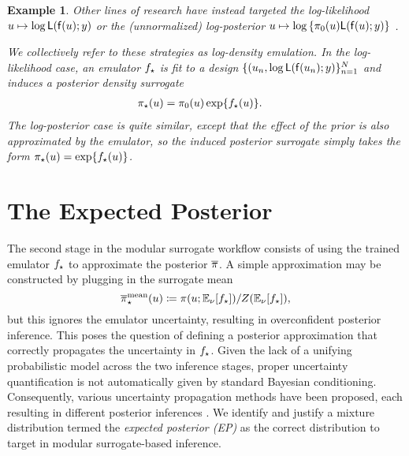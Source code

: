 \documentclass[12pt]{article}
\newtheorem{ex}{Example}
\begin{document}
\begin{ex} \label{ex:ldens-em}
Other lines of research have instead targeted the log-likelihood $u \mapsto \log \mathsf{L}(\mathsf{f}(u); y)$
\citep{VehtariParallelGP,FATES_CES,trainDynamics,quantileApprox,
ActiveLearningMCMC,FerEmulation,StuartTeck1,random_fwd_models,
GP_PDE_priors,OakleyllikEm,JosephMinEnergy,AlawiehIterativeGP}
or the (unnormalized) log-posterior 
$u \mapsto \log \left\{\pi_0(u)\mathsf{L}(\mathsf{f}(u); y)\right\}$
\citep{emPostDens,Kandasamy_2017,llikRBF,gp_surrogates_random_exploration,
landslideCalibration}.

We collectively refer to these strategies as \textit{log-density emulation}. In the 
log-likelihood case, an emulator ${f}_{\star}$ is fit to a design 
$\{(u_n, \log \mathsf{L}(\mathsf{f}(u_n); y)\}_{n=1}^{N}$
and induces a posterior density surrogate 
\begin{align}
{\pi}_{\star}(u) &= \pi_0(u) \exp\mathopen{}\left\{{f}_{\star}(u)\right\}\mathclose{}. \label{eq:post-em-llik}
\end{align}
The log-posterior case is quite similar, except that the effect of the prior is also 
approximated by the emulator, so the induced posterior surrogate simply takes 
the form ${\pi}_{\star}(u) = \exp\mathopen{}\left\{{f}_{\star}(u)\right\}\mathclose{}$.
\end{ex}

\section{The Expected Posterior} \label{sec:EP}
The second stage in the modular surrogate workflow consists of using the 
trained emulator ${f}_{\star}$ to approximate the posterior $\overline{\pi}$.
A simple approximation may be constructed by plugging in the surrogate mean
\begin{equation}
{\overline{\pi}}_{\star}^{\mathrm{mean}}(u) \coloneqq \pi(u; \mathbb{E}_{\nu}[{f}_{\star}]) / Z(\mathbb{E}_{\nu}[{f}_{\star}]),
\label{eq:mean-approx}
\end{equation}
but this ignores the emulator uncertainty, resulting in overconfident 
posterior inference. This poses the question of defining a posterior approximation 
that correctly propagates the uncertainty in ${f}_{\star}$.
Given the lack of a unifying probabilistic model across the two inference stages, 
proper uncertainty quantification is not automatically given by standard Bayesian 
conditioning. Consequently, various uncertainty propagation methods have been 
proposed, each resulting in different posterior inferences 
\citep{BilionisBayesSurrogates,StuartTeck1,VehtariParallelGP,BurknerSurrogate,
FerEmulation}.
We identify and justify a mixture distribution termed the 
\textit{expected posterior (EP)} as the correct distribution to target in 
modular surrogate-based inference. 
\end{document}
